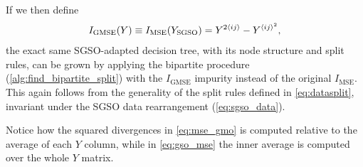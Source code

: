 If we then define
%
\begin{equation}
    I_\text{GMSE}(Y) \equiv I_\text{MSE}(Y_\text{SGSO})
        = Y^{2\langle ij\rangle} - Y^{\langle ij\rangle^2}\text{,}
    \label{eq:gso_mse}
\end{equation}
%
the exact same SGSO-adapted decision tree, with its node structure and split rules, can be grown by applying the bipartite procedure (\autoref{alg:find_bipartite_split}) with the $I_\text{GMSE}$ impurity instead of the original $I_\text{MSE}$. This again follows from the generality of the split rules defined in \autoref{eq:datasplit}, invariant under the SGSO data rearrangement (\autoref{eq:sgso_data}).


Notice how the squared divergences in \ref{eq:mse_gmo} is computed relative to the average of each $Y$ column, while in \ref{eq:gso_mse} the inner average is computed over the whole $Y$ matrix.  %

